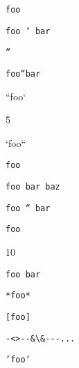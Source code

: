 
\def\mytitle{Code Spans}


\texttt{foo}

\texttt{foo ` bar}

\texttt{``}

\texttt{foo``bar}

``foo`

5

`foo``

\texttt{foo}

\texttt{foo   bar
baz}

\texttt{foo `` bar}

\texttt{foo}

10

\texttt{foo   bar}

\texttt{*foo*}

\texttt{[foo]}

\texttt{-<>-{}-\&\textbackslash{}\&-{}-{}-...}

\texttt{`foo`}



